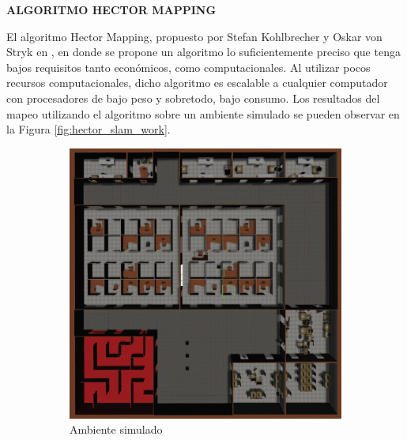 \textbf{ALGORITMO HECTOR MAPPING}

El algoritmo Hector Mapping, propuesto por Stefan Kohlbrecher y Oskar von Stryk en \cite{kohlbrecher_flexible_2011}, en donde se propone un algoritmo lo suficientemente preciso que tenga bajos requisitos tanto económicos, como computacionales. Al utilizar pocos recursos computacionales, dicho algoritmo es escalable a cualquier computador con procesadores de bajo peso y sobretodo, bajo consumo. Los resultados del mapeo utilizando el algoritmo sobre un ambiente simulado se pueden observar en la Figura \ref{fig:hector_slam_work}.

\begin{figure}[H]
    \centering
    \begin{subfigure}[b]{0.40\textwidth}
    \includegraphics[width=\textwidth, height=\textwidth]{figures/02marco_conceptual/hector_slam_simulation.png}
    \caption{Ambiente simulado}
    \label{fig:hector_slam_sim}
    \end{subfigure}
    \begin{subfigure}[b]{0.40\textwidth}

\end{subfigure}
\end{figure}
